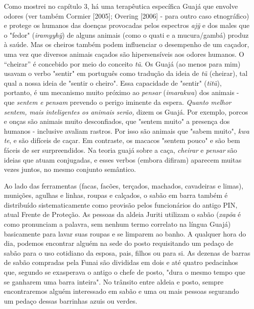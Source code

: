 Como mostrei no capítulo 3, há uma terapêutica específica Guajá que
envolve odores (ver também Cormier {[}2005{]}; Overing {[}2006{]} - para
outro caso etnográfico) e protege os humanos das doenças provocadas
pelos espectros \emph{ajỹ} e dos males que o "fedor" (\emph{iramyyhỹ})
de alguns animais (como o quati e a mucura/gambá) produz à saúde. Mas os
cheiros também podem influenciar o desempenho de um caçador, uma vez que
diversos animais caçados são hipersensíveis aos odores humanos. O
``cheirar'' é concebido por meio do conceito \emph{tũ}. Os Guajá (ao
menos para mim) usavam o verbo "sentir" em português como tradução da
ideia de \emph{tũ} (cheirar), tal qual a nossa ideia de "sentir o
cheiro". Essa capacidade de "sentir" (\emph{titũ}), portanto, é um
mecanismo muito próximo ao \emph{pensar} (\emph{imarakwa}) dos animais -
que \emph{sentem e pensam} prevendo o perigo iminente da espera.
\emph{Quanto melhor sentem, mais inteligentes os animais serão,} dizem
os Guajá. Por exemplo, porcos e onças são animais muito desconfiados,
que "sentem muito" a presença dos humanos - inclusive avaliam rastros.
Por isso são animais que "sabem muito", \emph{kwa te}, e são difíceis de
caçar. Em contraste, os macacos "sentem pouco" e são bem fáceis de ser
surpreendidos. Na teoria guajá sobre a caça, \emph{cheirar} e
\emph{pensar} são ideias que atuam conjugadas, e esses verbos (embora
difiram) aparecem muitas vezes juntos, no mesmo conjunto semântico.

Ao lado das ferramentas (facas, facões, terçados, machados, cavadeiras e
limas), munições, agulhas e linhas, roupas e calçados, o sabão em barra
também é distribuído sistematicamente como provisão pelos funcionários
do antigo PIN, atual Frente de Proteção. As pessoas da aldeia Juriti
utilizam o sabão (\emph{xapõa} é como pronunciam a palavra, sem nenhum
termo correlato na língua Guajá) basicamente para lavar suas roupas e se
limparem ao banho. A qualquer hora do dia, podemos encontrar alguém na
sede do posto requisitando um pedaço de sabão para o uso cotidiano da
esposa, pais, filhos ou para si. As dezenas de barras de sabão compradas
pela Funai são divididas em dois e até quatro pedacinhos que, segundo se
exasperava o antigo o chefe de posto, "dura o mesmo tempo que se
ganharem uma barra inteira". No trânsito entre aldeia e posto, sempre
encontraremos alguém interessado em sabão e uma ou mais pessoas
segurando um pedaço dessas barrinhas azuis ou verdes.

